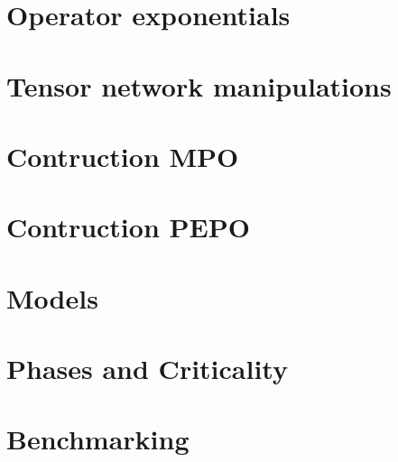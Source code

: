 \documentclass{article}
\begin{document}
\section{Operator exponentials}


\section{Tensor network manipulations}


\section{Contruction MPO}


\section{Contruction PEPO}


\section{Models}


\section{Phases and Criticality}


\section{Benchmarking}




\end{document}

